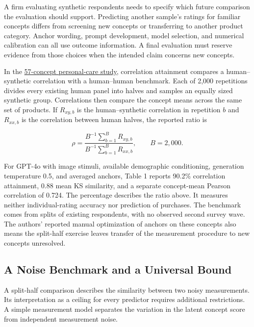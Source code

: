 \noindent \noindent A firm evaluating synthetic respondents needs to specify which
future comparison the evaluation should support. Predicting another
sample's ratings for familiar concepts differs from screening new
concepts or transferring to another product category. Anchor wording,
prompt development, model selection, and numerical calibration can all
use outcome information. A final evaluation must reserve evidence from
those choices when the intended claim concerns new concepts.

In the \href{https://arxiv.org/abs/2510.08338v3}{57-concept
personal-care study}, correlation attainment compares a human--synthetic
correlation with a human--human benchmark. Each of 2,000 repetitions
divides every existing human panel into halves and samples an equally
sized synthetic group. Correlations then compare the concept means
across the same set of products. If \(R_{xy,b}\) is the human--synthetic
correlation in repetition \(b\) and \(R_{xx,b}\) is the correlation
between human halves, the reported ratio is

\[
\rho=\frac{B^{-1}\sum_{b=1}^{B}R_{xy,b}}{B^{-1}\sum_{b=1}^{B}R_{xx,b}},\qquad B=2{,}000.
\]

For GPT-4o with image stimuli, available demographic conditioning,
generation temperature 0.5, and averaged anchors, Table 1 reports 90.2\%
correlation attainment, 0.88 mean KS similarity, and a separate
concept-mean Pearson correlation of 0.724. The percentage describes the
ratio above. It measures neither individual-rating accuracy nor
prediction of purchases. The benchmark comes from splits of existing
respondents, with no observed second survey wave. The authors' reported
manual optimization of anchors on these concepts also means the
split-half exercise leaves transfer of the measurement procedure to new
concepts unresolved.

\hypertarget{M07-a-noise-benchmark-and-a-universal-bound}{%
\subsection{A Noise Benchmark and a Universal
Bound}\label{M07-a-noise-benchmark-and-a-universal-bound}}

\noindent \noindent A split-half comparison describes the similarity between two
noisy measurements. Its interpretation as a ceiling for every predictor
requires additional restrictions. A simple measurement model separates
the variation in the latent concept score from independent measurement
noise.

